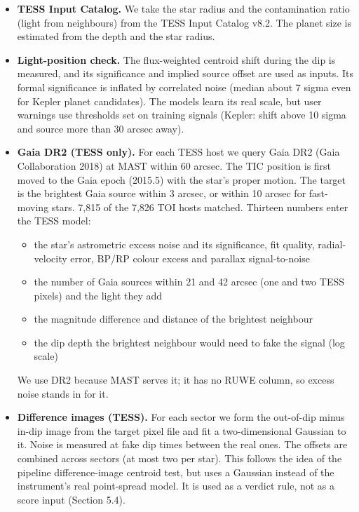 \documentclass[
]{article}
\providecommand{\tightlist}{%
  \setlength{\itemsep}{0pt}\setlength{\parskip}{0pt}}
\begin{document}
\begin{itemize}
\tightlist
\item
  \textbf{TESS Input Catalog.} We take the star radius and the
  contamination ratio (light from neighbours) from the TESS Input
  Catalog v8.2. The planet size is estimated from the depth and the star
  radius.
\item
  \textbf{Light-position check.} The flux-weighted centroid shift during
  the dip is measured, and its significance and implied source offset
  are used as inputs. Its formal significance is inflated by correlated
  noise (median about 7 sigma even for Kepler planet candidates). The
  models learn its real scale, but user warnings use thresholds set on
  training signals (Kepler: shift above 10 sigma and source more than 30
  arcsec away).
\item
  \textbf{Gaia DR2 (TESS only).} For each TESS host we query Gaia DR2
  (Gaia Collaboration 2018) at MAST within 60 arcsec. The TIC position
  is first moved to the Gaia epoch (2015.5) with the star's proper
  motion. The target is the brightest Gaia source within 3 arcsec, or
  within 10 arcsec for fast-moving stars. 7,815 of the 7,826 TOI hosts
  matched. Thirteen numbers enter the TESS model:

  \begin{itemize}
  \tightlist
  \item
    the star's astrometric excess noise and its significance, fit
    quality, radial-velocity error, BP/RP colour excess and parallax
    signal-to-noise
  \item
    the number of Gaia sources within 21 and 42 arcsec (one and two TESS
    pixels) and the light they add
  \item
    the magnitude difference and distance of the brightest neighbour
  \item
    the dip depth the brightest neighbour would need to fake the signal
    (log scale)
  \end{itemize}

  We use DR2 because MAST serves it; it has no RUWE column, so excess
  noise stands in for it.
\item
  \textbf{Difference images (TESS).} For each sector we form the
  out-of-dip minus in-dip image from the target pixel file and fit a
  two-dimensional Gaussian to it. Noise is measured at fake dip times
  between the real ones. The offsets are combined across sectors (at
  most two per star). This follows the idea of the pipeline
  difference-image centroid test, but uses a Gaussian instead of the
  instrument's real point-spread model. It is used as a verdict rule,
  not as a score input (Section 5.4).
\end{itemize}
\end{document}
